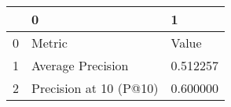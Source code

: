 \begin{tabular}{lll}
\toprule
 & 0 & 1 \\
\midrule
0 & Metric & Value \\
1 & Average Precision & 0.512257 \\
2 & Precision at 10 (P@10) & 0.600000 \\
\bottomrule
\end{tabular}
